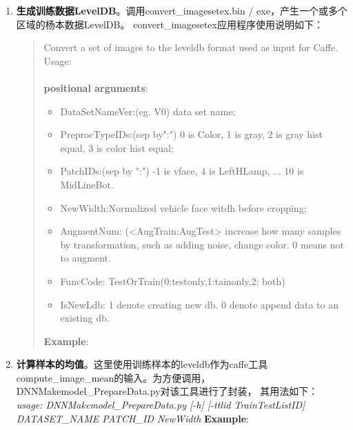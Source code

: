 \documentclass{article}
\begin{document}
\begin{CJK}{UTF8}{gbsn}
\begin{enumerate}
   \item \textbf{生成训练数据LevelDB}。调用convert\_imagesetex.bin / exe，产生一个或多个区域的杨本数据LevelDB。
       convert\_imagesetex应用程序使用说明如下：\\
       \begin{quotation}
         Convert a set of images to the leveldb format used as input for Caffe. Usage:\\
         \textit{\color{blue}{convert\_imagesetex DataSetNameVer(eg. V0, PreprocTypeIDs(sep by":") PatchIDs(sep by ":") NewWidth AugmentNum(<AugTrain:AugTest>) FuncCode(TestOrTrain, 0:testonly,1:tainonly,2: both) IsNewLdb} }\\
        \textbf{positional arguments}:\\
        \begin{itemize}
          \item DataSetNameVer:(eg. V0) data set name;
          \item PreprocTypeIDs:(sep by":") 0 is Color, 1 is gray, 2 is gray hist equal, 3 is color hist equal;
          \item PatchIDs:(sep by ":") -1 is vface, 4 is LeftHLamp, ... 10 is MidLineBot.
          \item NewWidth:Normalized vehicle face  witdh before cropping;
          \item AugmentNum: (<AugTrain:AugTest> increase how many samples by transformation, such as adding noise, change color. 0 means not to augment.
          \item FuncCode:  TestOrTrain(0:testonly,1:tainonly,2: both) 
          \item IsNewLdb: 1 denote creating new db. 0 denote append data to an existing db.
        \end{itemize}
        \textbf{Example}:\\
        \textit{\color{blue}{convert\_imagesetex.bin V1 0:1 -1:6 380 0:0 2 1}}
       \end{quotation}

    \item \textbf{计算样本的均值}。这里使用训练样本的leveldb作为caffe工具compute\_image\_mean的输入。为方便调用，DNNMakemodel\_PrepareData.py对该工具进行了封装，
                 其用法如下：\\
         \textit{usage: DNNMakemodel\_PrepareData.py [-h] [-ttlid TrainTestListID] DATASET\_NAME PATCH\_ID NewWidth}
         \textbf{Example}:\\
         \textit{\color{blue}{./DNNMakemodel\_PrepareData.py V1\_AAuMColor 6 150}}


\end{enumerate}
\end{CJK}
\end{document}
